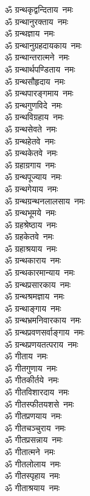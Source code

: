 \begin{multicols}{2}
\begin{flushleft}
ॐ ग्रन्थकृद्वन्दिताय~नमः\\
ॐ ग्रन्थानुरक्ताय~नमः\\
ॐ ग्रन्थज्ञाय~नमः\\
ॐ ग्रन्थानुग्रहदायकाय~नमः\\
ॐ ग्रन्थान्तरात्मने~नमः\\
ॐ ग्रन्थार्थपण्डिताय~नमः\\
ॐ ग्रन्थसौहृदाय~नमः\\
ॐ ग्रन्थपारङ्गमाय~नमः\hfill{}\\
ॐ ग्रन्थगुणविदे~नमः\\
ॐ ग्रन्थविग्रहाय~नमः\\
ॐ ग्रन्थसेवते~नमः\\
ॐ ग्रन्थहेतवे~नमः\\
ॐ ग्रन्थकेतवे~नमः\\
ॐ ग्रहाग्रगाय~नमः\\
ॐ ग्रन्थपूज्याय~नमः\\
ॐ ग्रन्थगेयाय~नमः\\
ॐ ग्रन्थग्रन्थनलालसाय~नमः\\
ॐ ग्रन्थभूमये~नमः\hfill{}\\
ॐ ग्रहश्रेष्ठाय~नमः\\
ॐ ग्रहकेतवे~नमः\\
ॐ ग्रहाश्रयाय~नमः\\
ॐ ग्रन्थकाराय~नमः\\
ॐ ग्रन्थकारमान्याय~नमः\\
ॐ ग्रन्थप्रसारकाय~नमः\\
ॐ ग्रन्थश्रमज्ञाय~नमः\\
ॐ ग्रन्थाङ्गाय~नमः\\
ॐ ग्रन्थभ्रमनिवारकाय~नमः\\
ॐ ग्रन्थप्रवणसर्वाङ्गाय~नमः\hfill{}\\
ॐ ग्रन्थप्रणयतत्पराय~नमः\\
ॐ गीताय~नमः\\
ॐ गीतगुणाय~नमः\\
ॐ गीतकीर्तये~नमः\\
ॐ गीतविशारदाय~नमः\\
ॐ गीतस्फीतयशसे~नमः\\
ॐ गीतप्रणयाय~नमः\\
ॐ गीतचञ्चुराय~नमः\\
ॐ गीतप्रसन्नाय~नमः\\
ॐ गीतात्मने~नमः\hfill{}\\
ॐ गीतलोलाय~नमः\\
ॐ गीतस्पृहाय~नमः\\
ॐ गीताश्रयाय~नमः\\

\end{flushleft}
\end{multicols}
